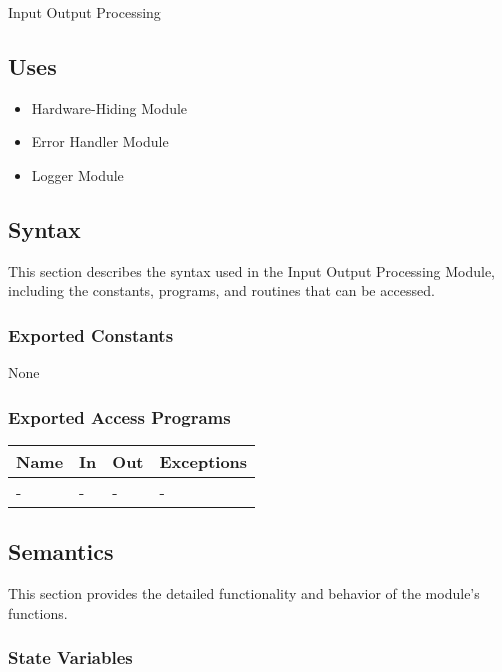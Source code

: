 \documentclass[12pt, titlepage]{article}
\begin{document}
Input Output Processing

\subsection{Uses}

\begin{itemize}
\item Hardware-Hiding Module
\item Error Handler Module
\item Logger Module
\end{itemize}

\subsection{Syntax}

This section describes the syntax used in the Input Output Processing Module,
including the constants, programs, and routines that can be accessed.

\subsubsection{Exported Constants}

None

\subsubsection{Exported Access Programs}

\begin{center}
\begin{tabular}{p{2cm} p{4cm} p{4cm} p{2cm}}
\hline
\textbf{Name} & \textbf{In} & \textbf{Out} & \textbf{Exceptions} \\
\hline
- & - & - & - \\
\hline
\end{tabular}
\end{center}

\subsection{Semantics}

This section provides the detailed functionality and behavior of the module’s
functions.

\subsubsection{State Variables}
\end{document}
